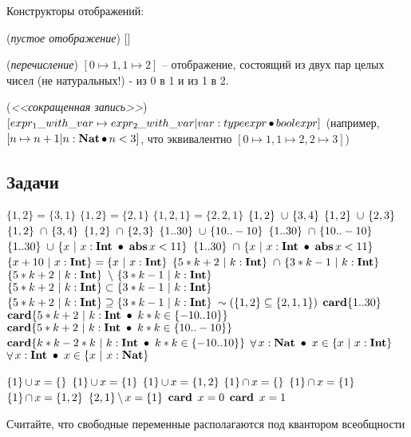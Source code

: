 Конструкторы отображений:
\begin{list}{}{}
\item (\emph{пустое отображение}) []
\item (\emph{перечисление}) $[0 \mapsto 1, 1 \mapsto 2]$ -- отображение, состоящий из двух пар целых чисел (не натуральных!) - из 0 в 1 и из 1 в 2.
\item (\emph{<<сокращенная запись>>}) $[expr_1\_with\_var \mapsto expr_2\_with\_var | var : typeexpr \mathop{\bullet} boolexpr]$ (например, $[n \mapsto n+1 | n : \textbf{Nat} \mathop{\bullet} n < 3]$, что эквивалентно $[0 \mapsto 1, 1 \mapsto 2, 2 \mapsto 3]$)
\end{list}


\subsection*{Задачи}


\z $\{1, 2\} = \{3, 1\}$
\z $\{1, 2\} = \{2, 1\}$
\z $\{1, 2, 1\} = \{2, 2, 1\}$
\z $\{1, 2\}~\mathop{\cup}~\{3, 4\}$
\z $\{1, 2\}~\mathop{\cup}~\{2, 3\}$
\z $\{1, 2\}~\mathop{\cap}~\{3, 4\}$
\z $\{1, 2\}~\mathop{\cap}~\{2, 3\}$
\z $\{1..30\}~\mathop{\cup}~\{10..-10\}$
\z $\{1..30\}~\mathop{\cap}~\{10..-10\}$
\z $\{1..30\}~\mathop{\cup}~\{x~|~ x: \textbf{Int}~\mathop{\bullet}~\mathop{\textbf{abs}} x < 11 \}$
\z $\{1..30\}~\mathop{\cap}~\{x~|~ x: \textbf{Int}~\mathop{\bullet}~\mathop{\textbf{abs}} x < 11 \}$
\z $\{x+10 ~|~ x: \textbf{Int} \} = \{x ~|~ x: \textbf{Int}\}$
\z $\{5*k + 2 ~|~ k : \textbf{Int} \}~\mathop{\cap}~\{3*k - 1 ~|~ k : \textbf{Int}\}$
\z $\{5*k + 2 ~|~ k : \textbf{Int} \}~\mathop{\setminus}~\{3*k - 1 ~|~ k : \textbf{Int}\}$
\z $\{5*k + 2 ~|~ k : \textbf{Int} \} \subset \{3*k - 1 ~|~ k : \textbf{Int}\}$
\z $\{5*k + 2 ~|~ k : \textbf{Int} \} \supseteq \{3*k - 1 ~|~ k : \textbf{Int}\}$
\z $\sim (\{1, 2\} \subseteq \{2, 1, 1\})$
\z $\mathop{\textbf{card}} \{1..30\}$
\z $\mathop{\textbf{card}} \{5*k + 2 ~|~ k : \textbf{Int}~\mathop{\bullet}~k * k \in \{-10..10\}\}$
\z $\mathop{\textbf{card}} \{5*k + 2 ~|~ k : \textbf{Int}~\mathop{\bullet}~k * k \in \{10..-10\}\}$
\z $\mathop{\textbf{card}} \{k*k - 2 * k ~|~ k : \textbf{Int}~\mathop{\bullet}~k * k \in \{-10..10\}\}$
\z $\mathop{\forall} x: \textbf{Nat} ~\mathop{\bullet}~ x \in \{x ~|~ x : \textbf{Int}\}$
\z $\mathop{\forall} x: \textbf{Int} ~\mathop{\bullet}~ x \in \{x ~|~ x : \textbf{Nat}\}$



\z $\{1\} \mathop{\cup} x = \{\}$
\z $\{1\} \mathop{\cup} x = \{1\}$
\z $\{1\} \mathop{\cup} x = \{1, 2\}$
\z $\{1\} \mathop{\cap} x = \{\}$
\z $\{1\} \mathop{\cap} x = \{1\}$
\z $\{1\} \mathop{\cap} x = \{1, 2\}$
\z $\{2, 1\} \mathop{\setminus} x = \{1\}$
\z $\mathop{\textbf{card}}~x = 0$
\z $\mathop{\textbf{card}}~x = 1$


Считайте, что свободные переменные располагаются под квантором
всеобщности

